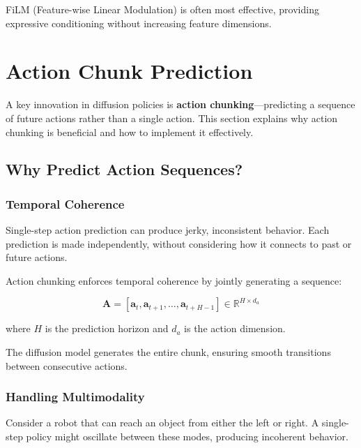 FiLM (Feature-wise Linear Modulation) is often most effective, providing expressive conditioning without increasing feature dimensions.

\section{Action Chunk Prediction}
\label{sec:action_chunk_prediction}

A key innovation in diffusion policies is \textbf{action chunking}---predicting a sequence of future actions rather than a single action. This section explains why action chunking is beneficial and how to implement it effectively.

\subsection{Why Predict Action Sequences?}
\label{subsec:why_action_sequences}

\subsubsection{Temporal Coherence}

Single-step action prediction can produce jerky, inconsistent behavior. Each prediction is made independently, without considering how it connects to past or future actions.

Action chunking enforces temporal coherence by jointly generating a sequence:

\begin{equation}
\mathbf{A} = [\mathbf{a}_{t}, \mathbf{a}_{t+1}, \ldots, \mathbf{a}_{t+H-1}] \in \mathbb{R}^{H \times d_a}
\label{eq:action_chunk}
\end{equation}

where $H$ is the prediction horizon and $d_a$ is the action dimension.

The diffusion model generates the entire chunk, ensuring smooth transitions between consecutive actions.

\subsubsection{Handling Multimodality}

Consider a robot that can reach an object from either the left or right. A single-step policy might oscillate between these modes, producing incoherent behavior.

